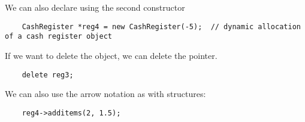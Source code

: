\documentclass[]{article}
\begin{document}
We can also declare using the second constructor

\begin{lstlisting}
	CashRegister *reg4 = new CashRegister(-5);	// dynamic allocation of a cash register object
\end{lstlisting}\bigbreak

If we want to delete the object, we can delete the pointer.

\begin{lstlisting}
	delete reg3;
\end{lstlisting}\bigbreak

We can also use the arrow notation as with structures:

\begin{lstlisting}
	reg4->additems(2, 1.5);
\end{lstlisting}\bigbreak
\end{document}
